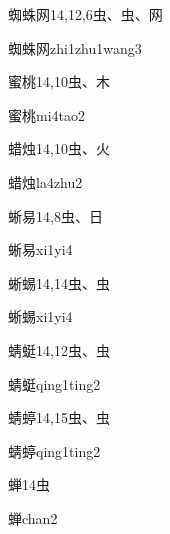 \begin{entry}{蜘蛛网}{14,12,6}{⾍、⾍、⽹}
  \begin{phonetics}{蜘蛛网}{zhi1zhu1wang3}
  \end{phonetics}
\end{entry}

\begin{entry}{蜜桃}{14,10}{⾍、⽊}
  \begin{phonetics}{蜜桃}{mi4tao2}
  \end{phonetics}
\end{entry}

\begin{entry}{蜡烛}{14,10}{⾍、⽕}
  \begin{phonetics}{蜡烛}{la4zhu2}
  \end{phonetics}
\end{entry}

\begin{entry}{蜥易}{14,8}{⾍、⽇}
  \begin{phonetics}{蜥易}{xi1yi4}
  \end{phonetics}
\end{entry}

\begin{entry}{蜥蜴}{14,14}{⾍、⾍}
  \begin{phonetics}{蜥蜴}{xi1yi4}
  \end{phonetics}
\end{entry}

\begin{entry}{蜻蜓}{14,12}{⾍、⾍}
  \begin{phonetics}{蜻蜓}{qing1ting2}
  \end{phonetics}
\end{entry}

\begin{entry}{蜻蝏}{14,15}{⾍、⾍}
  \begin{phonetics}{蜻蝏}{qing1ting2}
  \end{phonetics}
\end{entry}

\begin{entry}{蝉}{14}{⾍}
  \begin{phonetics}{蝉}{chan2}
  \end{phonetics}
\end{entry}

